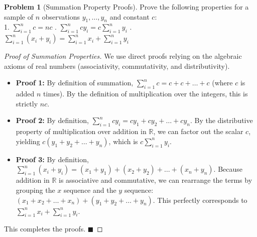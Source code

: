 \documentclass[11pt]{article}
\theoremstyle{definition}
\newtheorem{problem}{Problem}
\theoremstyle{remark}
\newcommand{\R}{\mathbb{R}}
\begin{document}
\begin{problem}[Summation Property Proofs]
Prove the following properties for a sample of $n$ observations $y_1, \dots, y_n$ and constant $c$: \\
1. $\sum_{i=1}^n c = nc$ . $\sum_{i=1}^n c y_i = c \sum_{i=1}^n y_i$ . $\sum_{i=1}^n (x_i + y_i) = \sum_{i=1}^n x_i + \sum_{i=1}^n y_i$
\end{problem}
\begin{proof}[Proof of Summation Properties]
We use direct proofs relying on the algebraic axioms of real numbers (associativity, commutativity, and distributivity).
\begin{itemize}
    \item \textbf{Proof 1:} By definition of summation, $\sum_{i=1}^n c = c + c + \dots + c$ (where $c$ is added $n$ times). By the definition of multiplication over the integers, this is strictly $nc$.
    \item \textbf{Proof 2:} By definition, $\sum_{i=1}^n c y_i = c y_1 + c y_2 + \dots + c y_n$. By the distributive property of multiplication over addition in $\R$, we can factor out the scalar $c$, yielding $c (y_1 + y_2 + \dots + y_n)$, which is $c \sum_{i=1}^n y_i$.
    \item \textbf{Proof 3:} By definition, $\sum_{i=1}^n (x_i + y_i) = (x_1 + y_1) + (x_2 + y_2) + \dots + (x_n + y_n)$. Because addition in $\R$ is associative and commutative, we can rearrange the terms by grouping the $x$ sequence and the $y$ sequence: $(x_1 + x_2 + \dots + x_n) + (y_1 + y_2 + \dots + y_n)$. This perfectly corresponds to $\sum_{i=1}^n x_i + \sum_{i=1}^n y_i$.
\end{itemize}
This completes the proofs. $\blacksquare$
\end{proof}
\end{document}

